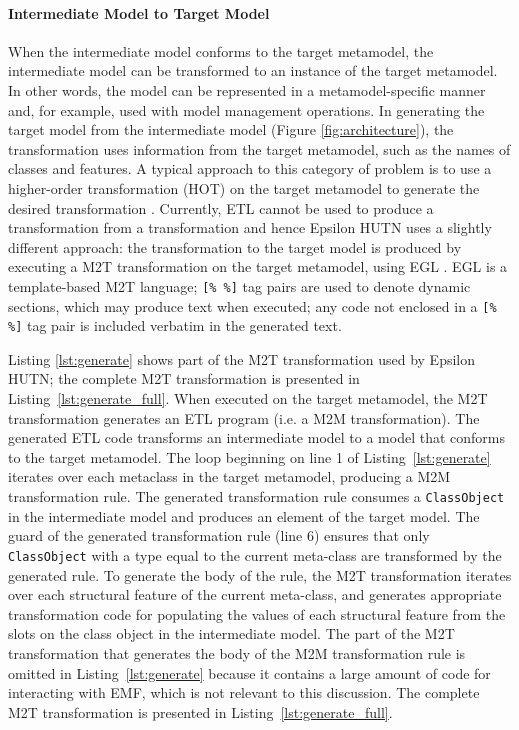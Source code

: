 \paragraph{Intermediate Model to Target Model}
When the intermediate model conforms to the target metamodel, the intermediate model can be transformed to an instance of the target metamodel. In other words, the model can be represented in a metamodel-specific manner and, for example, used with model management operations. In generating the target model from the intermediate model (Figure \ref{fig:architecture}), the transformation uses information from the target metamodel, such as the names of classes and features. A typical approach to this category of problem is to use a higher-order transformation (HOT) on the target metamodel to generate the desired transformation \cite{tisi09hot}. Currently, ETL cannot be used to produce a transformation from a transformation and hence Epsilon HUTN uses a slightly different approach: the transformation to the target model is produced by executing a M2T transformation on the target metamodel, using EGL \cite{rose08egl}. EGL is a template-based M2T language; \verb|[% %]| tag pairs are used to denote dynamic sections, which may produce text when executed; any code not enclosed in a \verb|[% %]| tag pair is included verbatim in the generated text.

Listing \ref{lst:generate} shows part of the M2T transformation used by Epsilon HUTN; the complete M2T transformation is presented in Listing~\ref{lst:generate_full}. When executed on the target metamodel, the M2T transformation generates an ETL program (i.e. a M2M transformation). The generated ETL code transforms an intermediate model to a model that conforms to the target metamodel. The loop beginning on line 1 of Listing~\ref{lst:generate} iterates over each metaclass in the target metamodel, producing a M2M transformation rule. The generated transformation rule consumes a \texttt{Cl\-a\-ssOb\-je\-ct} in the intermediate model and produces an element of the target model. The guard of the generated transformation rule (line 6) ensures that only \texttt{Cl\-a\-ssOb\-je\-ct} with a type equal to the current meta-class are transformed by the generated rule. To generate the body of the rule, the M2T transformation iterates over each structural feature of the current meta-class, and generates appropriate transformation code for populating the values of each structural feature from the slots on the class object in the intermediate model. The part of the M2T transformation that generates the body of the M2M transformation rule is omitted in Listing~\ref{lst:generate} because it contains a large amount of code for interacting with EMF, which is not relevant to this discussion. The complete M2T transformation is presented in Listing~\ref{lst:generate_full}.

